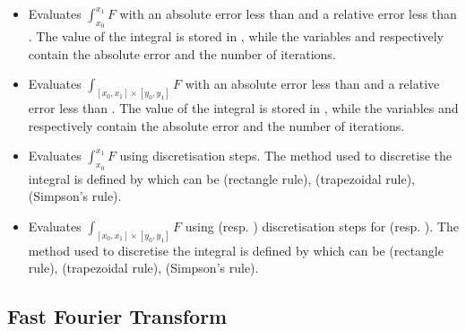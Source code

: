\begin{itemize}
\item {}
  \sshortdescribe Evaluates $\int_{x_0}^{x_1} F$ with an absolute error less than
   and a relative error less than
  . The value of the integral is stored in , while the
  variables  and  respectively contain the absolute
  error and the number of iterations.

\item {}
  \sshortdescribe Evaluates $\int_{[x_0, x_1] \times [y_0, y_1]} F$ with an
  absolute error less than  and a relative error less than
  . The value of the integral is stored in , while the
  variables  and  respectively contain the absolute
  error and the number of iterations.

\item {}
  \sshortdescribe Evaluates $\int_{x_0}^{x_1} F$ using  discretisation
  steps. The method used to discretise the integral is defined by 
  which can be  (rectangle rule),  (trapezoidal rule),
   (Simpson's rule).

\item {}
  \sshortdescribe Evaluates $\int_{[x_0, x_1] \times [y_0, y_1]} F$ using
   (resp. ) discretisation steps for \var{[x0, x1]}
  (resp. \var{[y0, y1]}). The method used to discretise the integral is
  defined by  which can be  (rectangle rule),
   (trapezoidal rule),    (Simpson's rule).
\end{itemize}


\subsection{Fast Fourier Transform}

